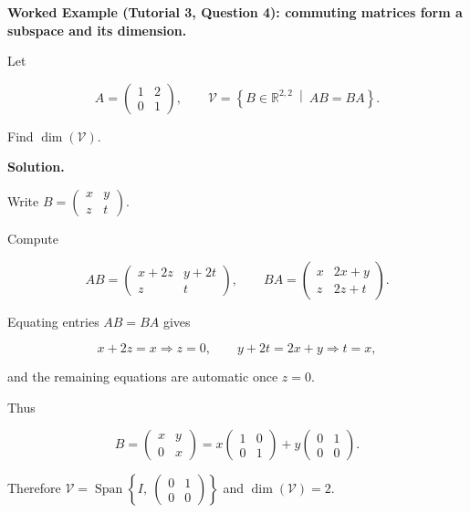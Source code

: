\begin{examplebox}

\textbf{Worked Example (Tutorial 3, Question 4): commuting matrices form a subspace and its dimension.}

Let

\[
A=\begin{pmatrix}1&2\\0&1\end{pmatrix},
\qquad
\mathcal{V}=\left\{B\in\mathbb{R}^{2,2}\ \middle|\ AB=BA\right\}.
\]

Find $\dim(\mathcal{V})$.

\medskip

\textbf{Solution.}

Write $B=\begin{pmatrix}x&y\\ z&t\end{pmatrix}$.

Compute

\[
AB=\begin{pmatrix}x+2z&y+2t\\ z&t\end{pmatrix},
\qquad
BA=\begin{pmatrix}x&2x+y\\ z&2z+t\end{pmatrix}.
\]

Equating entries $AB=BA$ gives

\[
x+2z=x \Rightarrow z=0,
\qquad
y+2t=2x+y \Rightarrow t=x,
\]

and the remaining equations are automatic once $z=0$.

Thus

\[
B=\begin{pmatrix}x&y\\0&x\end{pmatrix}
=x\begin{pmatrix}1&0\\0&1\end{pmatrix}
+y\begin{pmatrix}0&1\\0&0\end{pmatrix}.
\]

Therefore $\mathcal{V}=\operatorname{Span}\!\left\{I,\ \begin{pmatrix}0&1\\0&0\end{pmatrix}\right\}$ and $\dim(\mathcal{V})=2$.

\end{examplebox}

